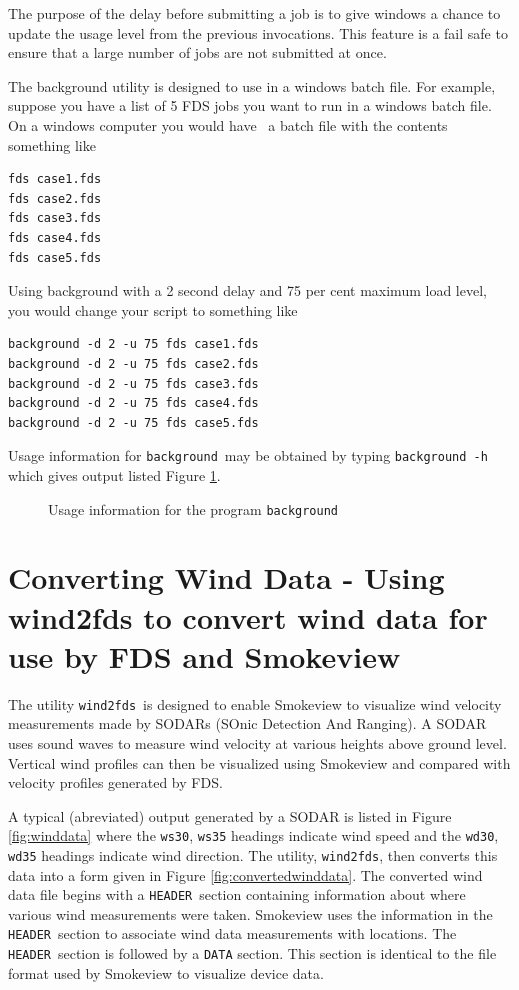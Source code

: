 \documentclass[11pt,twoside]{book}
\begin{document}
The purpose of the delay before submitting a job is to give windows a
chance to update the usage level from the
previous invocations.  This feature is a fail safe to ensure that a
large number of jobs are not
submitted at once.

The background utility is designed to use in a windows batch file.
For example, suppose you have
a list of 5 FDS jobs you want to run in a windows batch file. On a
windows computer you would have \
a batch file with the contents something like

\begin{lstlisting}
fds case1.fds
fds case2.fds
fds case3.fds
fds case4.fds
fds case5.fds
\end{lstlisting}

Using background with a 2 second delay and 75 per cent maximum
load level, you would change your script to something like

\begin{lstlisting}
background -d 2 -u 75 fds case1.fds
background -d 2 -u 75 fds case2.fds
background -d 2 -u 75 fds case3.fds
background -d 2 -u 75 fds case4.fds
background -d 2 -u 75 fds case5.fds
\end{lstlisting}

Usage information for {\tt background}\ may be obtained
by typing {\tt background -h} which gives output listed Figure \ref{fig:background}.

\begin{figure}[\figoptions]
{\small

}
\caption {Usage information for the program {\tt background}}
\label{fig:background}%
\end{figure}

\section{Converting Wind Data - Using wind2fds to convert wind data for use by FDS and Smokeview}
The utility {\tt wind2fds}\ is designed to enable Smokeview to visualize wind velocity measurements made by SODARs
(SOnic Detection And Ranging).
A SODAR uses sound waves to measure wind velocity at various heights above ground level.
Vertical wind profiles can then be visualized using Smokeview and compared with velocity profiles generated by FDS.

A typical (abreviated) output generated by a SODAR is listed in Figure \ref{fig:winddata} where
the {\tt ws30}, {\tt ws35} headings indicate wind speed
and the {\tt wd30}, {\tt wd35} headings indicate wind direction.
The utility, {\tt wind2fds}, then converts this data into a form given in Figure \ref{fig:convertedwinddata}.
The converted wind data file begins with a {\tt HEADER}\ section
containing information about where various wind measurements were taken. Smokeview uses the information in the {\tt HEADER}\ section to associate wind data measurements with locations. The {\tt HEADER}\ section is followed by a {\tt DATA} section.  This section is identical
to the file format used by Smokeview to visualize device data.
\end{document}
